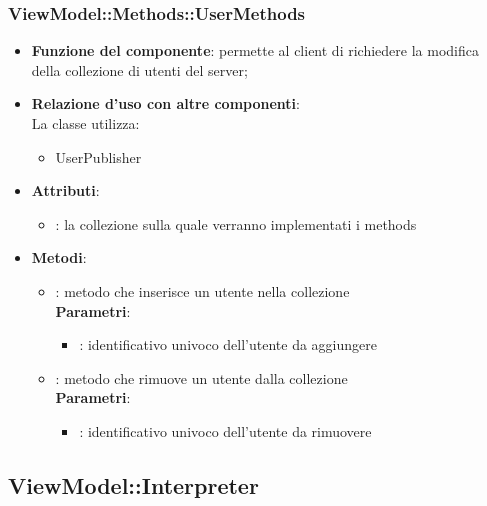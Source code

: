 \subsubsection{ViewModel::Methods::UserMethods}
\begin{itemize}
\item\textbf{Funzione del componente}: permette al client di richiedere la modifica della collezione di utenti del server;
	\item\textbf{Relazione d'uso con altre componenti}: \\
La classe utilizza:
	\begin{itemize}
		\item UserPublisher
	\end{itemize}
\item\textbf{Attributi}:
	\begin{itemize}
		\item{}: la collezione sulla quale verranno implementati i methods\\
	\end{itemize}
\item\textbf{Metodi}:
	\begin{itemize}
		\item{}: metodo che inserisce un utente nella collezione\\
		\textbf{Parametri}:
			\begin{itemize}
				\item{}: identificativo univoco dell'utente da aggiungere\\
			\end{itemize}
		\item{}: metodo che rimuove un utente dalla collezione\\
		\textbf{Parametri}:
			\begin{itemize}
				\item{}: identificativo univoco dell'utente da rimuovere\\
			\end{itemize}
	\end{itemize}
\end{itemize}

\subsection{ViewModel::Interpreter}
